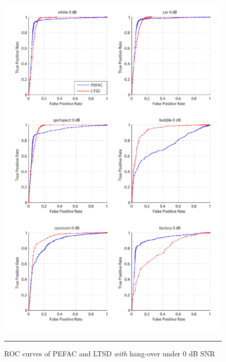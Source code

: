 \begin{figure}[htbp]
	\centering
		\includegraphics[width=1.0\columnwidth]{Figures/Chapter5/pefac0.pdf}
		\rule{37em}{0.5pt}
	\caption[ROC curves of PEFAC and LTSD \emph{with} hang-over under 0 dB SNR]{ROC curves of PEFAC and LTSD \emph{with} hang-over under 0 dB SNR}
	\label{fig:pefac0}
\end{figure}

